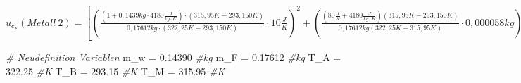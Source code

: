 \documentclass[
  9pt,
]{article}
\newenvironment{Shaded}{\begin{snugshade}}{\end{snugshade}}
\newcommand{\CommentTok}[1]{\textcolor[rgb]{0.56,0.35,0.01}{\textit{#1}}}
\newcommand{\FloatTok}[1]{\textcolor[rgb]{0.00,0.00,0.81}{#1}}
\newcommand{\NormalTok}[1]{#1}
\newcommand{\OtherTok}[1]{\textcolor[rgb]{0.56,0.35,0.01}{#1}}
\begin{document}
\(u_{c_F}(Metall\ 2)=[(\frac{(1+0,1439kg\cdot 4180\frac{J}{kg\cdot K})\cdot (315,95K-293,150K)}{0,17612kg\cdot (322,25K-293,150K)}\cdot 10\frac{J}{K})^2+(\frac{(80\frac{J}{K}+4180\frac{J}{kg\cdot K})(315,95K-293,150K)}{0,17612kg(322,25K-315,95K)}\cdot 0,000058kg)^2+(\frac{(80\frac{J}{K}+0,1439kg\cdot 4180\frac{J}{kg\cdot K})\cdot (1-293,150K)}{0,17612kg(322,25K-1)}\cdot 0,029K)^2+(\frac{(80\frac{J}{K}+0,1439kg\cdot 4180\frac{J}{kg\cdot K})\cdot (315,95K-1)}{0,17612kg(322,25K-315,95K)}\cdot 0,029K)^2+(\frac{(80\frac{J}{K}+0,1439kg\cdot 4180\frac{J}{kg\cdot K})\cdot (315,95K-293,150K)}{322,25K-315,95K}\cdot 0,000029kg)^2+(\frac{(80\frac{J}{K}+0,1439kg\cdot 4180\frac{J}{kg\cdot K})\cdot (315,95K-293,150K)}{0,17612kg(1-315,95K)}\cdot 0,029K)^2]^{\frac{1}{2}}\)

\begin{Shaded}
\begin{Highlighting}[]
\CommentTok{\# Neudefinition Variablen}
\NormalTok{m\_w }\OtherTok{=} \FloatTok{0.14390} \CommentTok{\#kg}
\NormalTok{m\_F }\OtherTok{=} \FloatTok{0.17612} \CommentTok{\#kg}
\NormalTok{T\_A }\OtherTok{=} \FloatTok{322.25} \CommentTok{\#K}
\NormalTok{T\_B }\OtherTok{=} \FloatTok{293.15} \CommentTok{\#K}
\NormalTok{T\_M }\OtherTok{=} \FloatTok{315.95} \CommentTok{\#K}


\end{Highlighting}
\end{Shaded}
\end{document}
